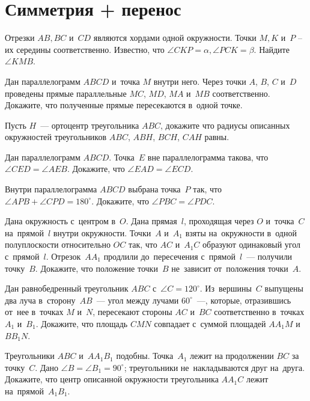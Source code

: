

\section*{Симметрия + перенос}


\begin{problems}

\item
Отрезки $AB, BC$ и~$CD$ являются хордами одной окружности.
Точки $M,K$ и~$P$ – их середины соответственно.
Известно, что $\angle CKP = \alpha, \angle PCK = \beta$.
Найдите $\angle KMB$.

\item
Дан параллелограмм $ABCD$ и~точка $M$ внутри него.
Через точки $A$, $B$, $C$ и~$D$ проведены прямые параллельные $MC$, $MD$, $MA$
и~$MB$ соответственно.
Докажите, что полученные прямые пересекаются в~одной точке.

\item
Пусть $H$~--- ортоцентр треугольника $ABC$, докажите что радиусы описанных
окружностей треугольников $ABC$, $ABH$, $BCH$, $CAH$ равны.

\item
Дан параллелограмм $ABCD$.
Точка~$E$ вне параллелограмма такова, что $\angle CED = \angle AEB$.
Докажите, что $\angle EAD = \angle ECD$.

\item
Внутри параллелограмма $ABCD$ выбрана точка~$P$ так, что
$\angle APB + \angle CPD = 180^{\circ}$.
Докажите, что $\angle PBC = \angle PDC$.

\item
Дана окружность с~центром в~$O$.
Дана прямая~$l$, проходящая через $O$ и~точка~$C$ на~прямой~$l$ внутри
окружности.
Точки~$A$ и~$A_1$ взяты на~окружности в~одной полуплоскости относительно $OC$
так, что $AC$ и~$A_1 C$ образуют одинаковый угол с~прямой~$l$.
Отрезок~$A A_1$ продлили до~пересечения с~прямой~$l$~--- получили точку~$B$.
Докажите, что положение точки~$B$ не~зависит от~положения точки~$A$.

\item
Дан равнобедренный треугольник $ABC$ с~$\angle C = 120^{\circ}$.
Из~вершины~$C$ выпущены
два луча в~сторону~$AB$~--- угол между лучами $60^{\circ}$~---,
которые, отразившись от~нее в~точках $M$ и~$N$, пересекают стороны $AC$ и~$BC$
соответственно в~точках $A_1$ и~$B_1$.
Докажите, что площадь $CMN$ совпадает с~суммой площадей $A A_1 M$ и~$B B_1 N$.

\item
Треугольники $A B C$ и~$A A_1 B_1$ подобны.
Точка~$A_1$ лежит на продолжении $BC$ за точку~$C$.
Дано $\angle B = \angle B_1 = 90^{\circ}$;
треугольники не~накладываются друг на~друга.
Докажите, что центр описанной окружности треугольника $A A_1 C$ лежит
на~прямой~$A_1 B_1$.

\end{problems}

